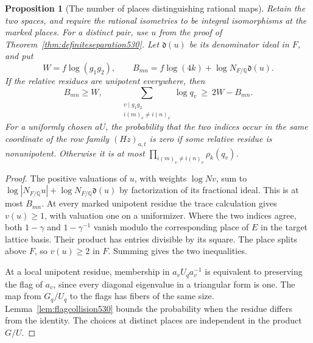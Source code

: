 \documentclass[a4paper,11pt]{article}
\newtheorem{proposition}{Proposition}[section]
\theoremstyle{definition}
\theoremstyle{remark}
\numberwithin{equation}{section}
\begin{document}
\begin{proposition}[The number of places distinguishing rational maps]
\leavevmode\label{prop:heightcollision530}
Retain the two spaces, and require the rational isometries to be
integral isomorphisms at the marked places. For a distinct pair,
use \(u\) from the proof of Theorem~\ref{thm:definiteseparation530}.
Let \(\mathfrak d(u)\) be its denominator ideal in \(F\), and put
\[
 W=f\log(g_1g_2),\qquad
 B_{mn}= f\log(4k)+\log N_{F/\mathbb Q}\mathfrak d(u).
\]
If the relative residues are unipotent everywhere, then
\[
  B_{mn}\ge W,\qquad
  \sum_{\substack{v\mid g_1g_2\\ i(m)_v\ne i(n)_v}}\log q_v
                                      \ \ge\ 2W-B_{mn}.
\]
For a uniformly chosen \(aU\), the probability that the two
indices occur in the same coordinate of the row family
\((Hz)_{a,t}\) is zero if some relative residue is nonunipotent.
Otherwise it is at most
\(\prod_{i(m)_v\ne i(n)_v}\rho_k(q_v)\).
\end{proposition}
\begin{proof}
The positive valuations of \(u\), with weights \(\log Nv\),
sum to \(\log|N_{F/\mathbb Q}u|+\log N_{F/\mathbb Q}\mathfrak d(u)\)
by factorization of its fractional ideal. This is at most \(B_{mn}\).
At every marked unipotent residue the trace calculation gives
\(v(u)\ge1\), with valuation one on a uniformizer. Where the two
indices agree, both \(1-\gamma\) and \(1-\gamma^{-1}\) vanish
modulo the corresponding place of \(E\) in the target lattice
basis. Their product has entries divisible by its square. The
place splits above \(F\), so \(v(u)\ge2\) in \(F\).
Summing gives the two inequalities.

At a local unipotent residue, membership in \(a_vU_qa_v^{-1}\)
is equivalent to preserving the flag of \(a_v\), since every
diagonal eigenvalue in a triangular form is one. The map from
\(G_q/U_q\) to the flags has fibers of the same size.
Lemma~\ref{lem:flagcollision530} bounds the probability when
the residue differs from the identity. The choices at distinct
places are independent in the product \(G/U\).
\end{proof}
\end{document}

